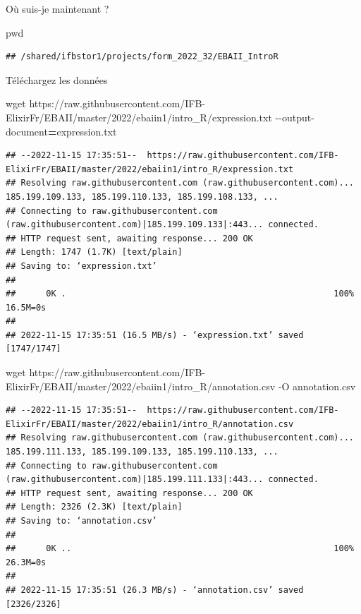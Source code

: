 \documentclass[
]{book}
\newenvironment{Shaded}{\begin{snugshade}}{\end{snugshade}}
\newcommand{\AttributeTok}[1]{\textcolor[rgb]{0.77,0.63,0.00}{#1}}
\newcommand{\BuiltInTok}[1]{#1}
\newcommand{\FunctionTok}[1]{\textcolor[rgb]{0.00,0.00,0.00}{#1}}
\newcommand{\NormalTok}[1]{#1}
\newcommand{\OperatorTok}[1]{\textcolor[rgb]{0.81,0.36,0.00}{\textbf{#1}}}
\begin{document}
Où suis-je maintenant ?

\begin{Shaded}
\begin{Highlighting}[]
\BuiltInTok{pwd}
\end{Highlighting}
\end{Shaded}

\begin{verbatim}
## /shared/ifbstor1/projects/form_2022_32/EBAII_IntroR
\end{verbatim}

Téléchargez les données

\begin{Shaded}
\begin{Highlighting}[]
\FunctionTok{wget}\NormalTok{ https://raw.githubusercontent.com/IFB{-}ElixirFr/EBAII/master/2022/ebaiin1/intro\_R/expression.txt }\AttributeTok{{-}{-}output{-}document}\OperatorTok{=}\NormalTok{expression.txt}
\end{Highlighting}
\end{Shaded}

\begin{verbatim}
## --2022-11-15 17:35:51--  https://raw.githubusercontent.com/IFB-ElixirFr/EBAII/master/2022/ebaiin1/intro_R/expression.txt
## Resolving raw.githubusercontent.com (raw.githubusercontent.com)... 185.199.109.133, 185.199.110.133, 185.199.108.133, ...
## Connecting to raw.githubusercontent.com (raw.githubusercontent.com)|185.199.109.133|:443... connected.
## HTTP request sent, awaiting response... 200 OK
## Length: 1747 (1.7K) [text/plain]
## Saving to: ‘expression.txt’
## 
##      0K .                                                     100% 16.5M=0s
## 
## 2022-11-15 17:35:51 (16.5 MB/s) - ‘expression.txt’ saved [1747/1747]
\end{verbatim}

\begin{Shaded}
\begin{Highlighting}[]
\FunctionTok{wget}\NormalTok{ https://raw.githubusercontent.com/IFB{-}ElixirFr/EBAII/master/2022/ebaiin1/intro\_R/annotation.csv }\AttributeTok{{-}O}\NormalTok{ annotation.csv}
\end{Highlighting}
\end{Shaded}

\begin{verbatim}
## --2022-11-15 17:35:51--  https://raw.githubusercontent.com/IFB-ElixirFr/EBAII/master/2022/ebaiin1/intro_R/annotation.csv
## Resolving raw.githubusercontent.com (raw.githubusercontent.com)... 185.199.111.133, 185.199.109.133, 185.199.110.133, ...
## Connecting to raw.githubusercontent.com (raw.githubusercontent.com)|185.199.111.133|:443... connected.
## HTTP request sent, awaiting response... 200 OK
## Length: 2326 (2.3K) [text/plain]
## Saving to: ‘annotation.csv’
## 
##      0K ..                                                    100% 26.3M=0s
## 
## 2022-11-15 17:35:51 (26.3 MB/s) - ‘annotation.csv’ saved [2326/2326]
\end{verbatim}
\end{document}

